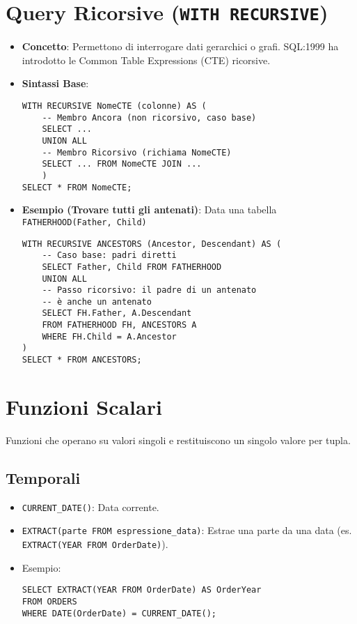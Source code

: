 \documentclass{article}
\begin{document}
	\section{Query Ricorsive (\texttt{WITH RECURSIVE})}
	\begin{itemize}
		\item \textbf{Concetto}: Permettono di interrogare dati gerarchici o grafi. SQL:1999 ha introdotto le Common Table Expressions (CTE) ricorsive.
		\item \textbf{Sintassi Base}:
		\begin{verbatim}
WITH RECURSIVE NomeCTE (colonne) AS (
	-- Membro Ancora (non ricorsivo, caso base)
	SELECT ...
	UNION ALL
	-- Membro Ricorsivo (richiama NomeCTE)
	SELECT ... FROM NomeCTE JOIN ...
	)
SELECT * FROM NomeCTE;
		\end{verbatim}
		\item \textbf{Esempio (Trovare tutti gli antenati)}: Data una tabella \texttt{FATHERHOOD(Father, Child)}
		\begin{verbatim}
WITH RECURSIVE ANCESTORS (Ancestor, Descendant) AS (
	-- Caso base: padri diretti
	SELECT Father, Child FROM FATHERHOOD
	UNION ALL
	-- Passo ricorsivo: il padre di un antenato
	-- è anche un antenato
	SELECT FH.Father, A.Descendant
	FROM FATHERHOOD FH, ANCESTORS A
	WHERE FH.Child = A.Ancestor
)
SELECT * FROM ANCESTORS;
		\end{verbatim}
	\end{itemize}
	
	\section{Funzioni Scalari}
	Funzioni che operano su valori singoli e restituiscono un singolo valore per tupla.
	
	\subsection{Temporali}
	\begin{itemize}
		\item \texttt{CURRENT\_DATE()}: Data corrente.
		\item \texttt{EXTRACT(parte FROM espressione\_data)}: Estrae una parte da una data (es. \texttt{EXTRACT(YEAR FROM OrderDate)}).
		\item Esempio:
		\begin{verbatim}
SELECT EXTRACT(YEAR FROM OrderDate) AS OrderYear
FROM ORDERS
WHERE DATE(OrderDate) = CURRENT_DATE();
		\end{verbatim}
	\end{itemize}
	
\end{document}
